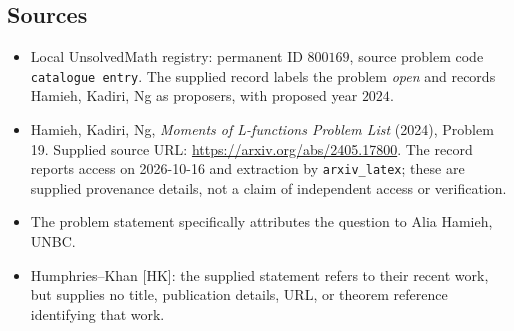 \documentclass[11pt]{article}
\begin{document}
\subsection{Sources}
\begin{itemize}
\item Local UnsolvedMath registry: permanent ID \(800169\), source problem code \texttt{catalogue entry}. The supplied record labels the problem \emph{open} and records Hamieh, Kadiri, Ng as proposers, with proposed year \(2024\).
\item Hamieh, Kadiri, Ng, \emph{Moments of L-functions Problem List} (2024), Problem 19. Supplied source URL: \url{https://arxiv.org/abs/2405.17800}. The record reports access on 2026-10-16 and extraction by \texttt{arxiv\_latex}; these are supplied provenance details, not a claim of independent access or verification.
\item The problem statement specifically attributes the question to Alia Hamieh, UNBC.
\item Humphries--Khan [HK]: the supplied statement refers to their recent work, but supplies no title, publication details, URL, or theorem reference identifying that work.
\end{itemize}
\end{document}
